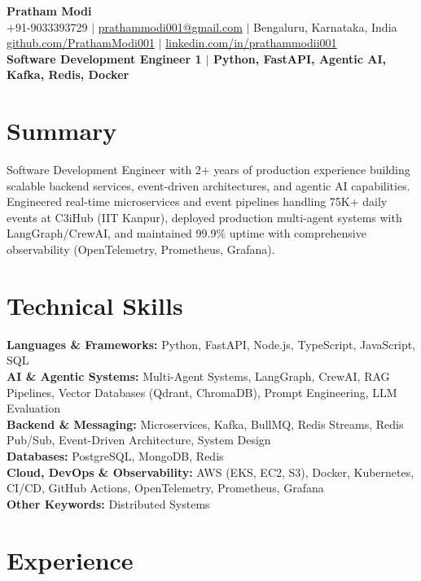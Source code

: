 \documentclass[10pt]{article}
\begin{document}
\begin{center}
{\Huge \textbf{Pratham Modi}} \\[2pt]
+91-9033393729 $\vert$ \href{mailto:prathammodi001@gmail.com}{prathammodi001@gmail.com} $\vert$ Bengaluru, Karnataka, India \\[1pt]
\href{https://github.com/PrathamModi001}{github.com/PrathamModi001} $\vert$ \href{https://www.linkedin.com/in/prathammodii001/}{linkedin.com/in/prathammodii001} \\[2pt]
\textbf{Software Development Engineer 1 $\vert$ Python, FastAPI, Agentic AI, Kafka, Redis, Docker}

\end{center}

\vspace{-6pt}
\section{Summary}
Software Development Engineer with 2+ years of production experience building scalable backend services, event-driven architectures, and agentic AI capabilities. Engineered real-time microservices and event pipelines handling 75K+ daily events at C3iHub (IIT Kanpur), deployed production multi-agent systems with LangGraph/CrewAI, and maintained 99.9\% uptime with comprehensive observability (OpenTelemetry, Prometheus, Grafana).

\section{Technical Skills}
\textbf{Languages \& Frameworks:} Python, FastAPI, Node.js, TypeScript, JavaScript, SQL \\
\textbf{AI \& Agentic Systems:} Multi-Agent Systems, LangGraph, CrewAI, RAG Pipelines, Vector Databases (Qdrant, ChromaDB), Prompt Engineering, LLM Evaluation \\
\textbf{Backend \& Messaging:} Microservices, Kafka, BullMQ, Redis Streams, Redis Pub/Sub, Event-Driven Architecture, System Design \\
\textbf{Databases:} PostgreSQL, MongoDB, Redis \\
\textbf{Cloud, DevOps \& Observability:} AWS (EKS, EC2, S3), Docker, Kubernetes, CI/CD, GitHub Actions, OpenTelemetry, Prometheus, Grafana \\
\textbf{Other Keywords:} Distributed Systems \\

\section{Experience}
\end{document}
